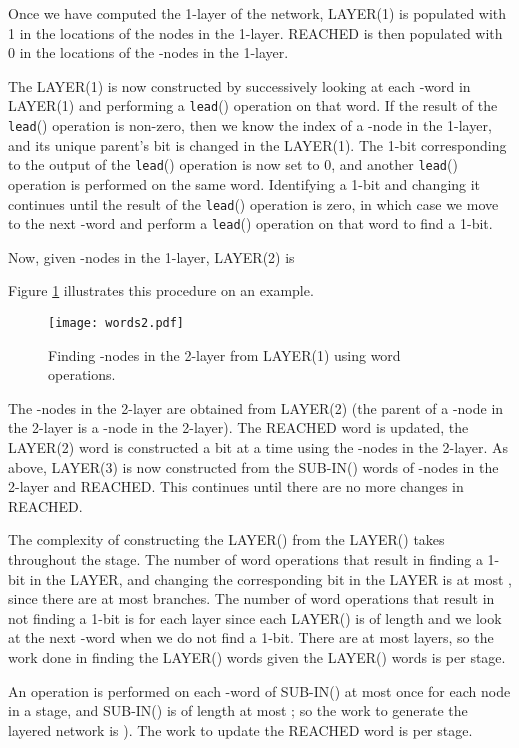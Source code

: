 \documentclass{article}
\begin{document}
Once we have computed the 1-layer of the network, LAYER(1) is populated with 1 in the locations of the nodes in the 1-layer. REACHED is then populated with 0 in the locations of the -nodes in the 1-layer.

The LAYER(1) is now constructed by successively looking at each -word in LAYER(1) and performing a {\tt lead}() operation on that word. If the result of the {\tt lead}() operation is non-zero, then we know the index of a -node in the 1-layer, and its unique parent's bit is changed in the LAYER(1). The 1-bit corresponding to the output of the {\tt lead}() operation is now set to 0, and another {\tt lead}() operation is performed on the same word.  Identifying a 1-bit and changing it continues until the result of the {\tt lead}() operation is zero, in which case we move to the next -word and perform a {\tt lead}() operation on that word to find a 1-bit.

Now, given -nodes  in the 1-layer, LAYER(2) is

Figure \ref{fig:words2} illustrates this procedure on an example.

\begin{figure}[t]
\centerline{\texttt{[image: words2.pdf]}}
\caption{\label{fig:words2}Finding -nodes in the 2-layer from LAYER(1) using word operations.}
\end{figure}

The -nodes in the 2-layer are obtained from LAYER(2) (the parent of a -node in the 2-layer is a -node in the 2-layer). The REACHED word is updated, the LAYER(2) word is constructed a bit at a time using the -nodes in the 2-layer. As above, LAYER(3) is now constructed from the SUB-IN() words of -nodes in the 2-layer and REACHED. This continues until there are no more changes in REACHED.

The complexity of constructing the LAYER() from the LAYER() takes  throughout the stage. The number of word operations that result in finding a 1-bit in the LAYER, and changing the corresponding bit in the LAYER is at most , since there are at most   branches. The number of word operations that result in not finding a 1-bit is  for each layer since each LAYER() is of length  and we look at the next -word when we do not find a 1-bit. There are at most  layers, so the work done in finding the LAYER() words given the LAYER() words is  per stage.

An operation is performed on each -word of SUB-IN() at most once for each node in a stage, and SUB-IN() is of length at most ; so the work to generate the layered network is ). The work to update the REACHED word is  per stage.
\end{document}

